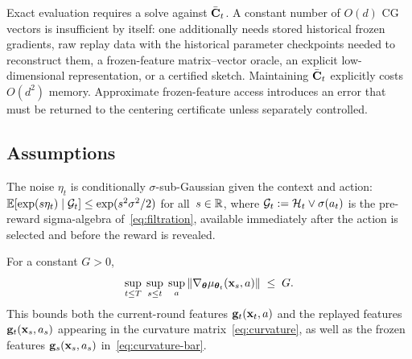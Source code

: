 \documentclass[twoside]{article}
\newcommand{\cHist}{\mathcal{H}}                %
\begin{document}
\begin{remark}
Exact evaluation requires a solve against $\bar{\mathbf{C}}_t$.  A constant number of
$O(d)$ CG vectors is insufficient by itself: one additionally needs stored
historical frozen gradients, raw replay data with the historical parameter
checkpoints needed to reconstruct them, a frozen-feature matrix--vector oracle,
an explicit low-dimensional representation, or a certified sketch.  Maintaining
$\bar{\mathbf{C}}_t$ explicitly costs $O(d^2)$ memory.  Approximate frozen-feature access
introduces an error that must be returned to the centering certificate unless
separately controlled.
\end{remark}

\subsection{Assumptions}\label{sec:assumptions}

\begin{assumption}\label{asm:noise}
The noise $\eta_t$ is conditionally $\sigma$-sub-Gaussian given the
context and action:
$\mathbb{E}[\exp(s\eta_t)\mid\mathcal{G}_t]\le\exp(s^2\sigma^2/2)$
for all~$s\in\mathbb{R}$, where
$\cG_t := \cHist_t\vee\sigma(a_t)$ is the pre-reward sigma-algebra
of~\eqref{eq:filtration}, available immediately after the action is
selected and before the reward is revealed.
\end{assumption}

\begin{assumption}\label{asm:bounded}
For a constant $G>0$,
\[
  \sup_{t\le T}\;\sup_{s\le t}\;\sup_{a}
  \|\nabla_{\boldsymbol{\theta}}\mu_{\boldsymbol{\theta}_t}(\mathbf{x}_s,a)\| \;\le\; G.
\]
This bounds both the current-round features
$\mathbf{g}_t(\mathbf{x}_t,a)$ and the replayed features
$\mathbf{g}_t(\mathbf{x}_s,a_s)$ appearing in the curvature
matrix~\eqref{eq:curvature}, as well as the frozen features
$\mathbf{g}_s(\mathbf{x}_s,a_s)$ in~\eqref{eq:curvature-bar}.
\end{assumption}
\end{document}
